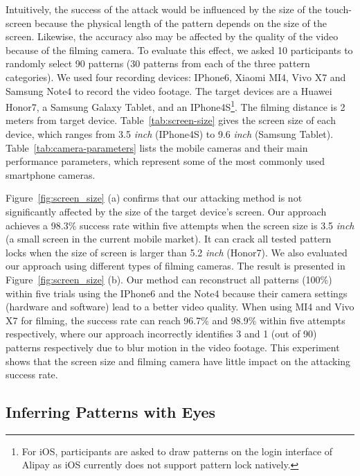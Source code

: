     Intuitively, the success of the attack would be influenced by the size of
    the touch-screen because the physical length of the pattern depends on
    the size of the screen. Likewise, the accuracy also may be affected by
    the quality of the video because of the filming camera. To evaluate this
    effect, we asked 10 participants to randomly select 90 patterns (30
    patterns from each of the three pattern categories). We used four
    recording devices: IPhone6, Xiaomi MI4, Vivo X7 and Samsung Note4 to
    record the video footage. The target devices are a Huawei Honor7, a
    Samsung Galaxy Tablet, and an IPhone4S\footnote{For iOS, participants are asked
    to draw  patterns on the login interface of Alipay as iOS
    currently does not support pattern lock natively.}. The filming distance is 2
    meters from target device. Table~\ref{tab:screen-size} gives the screen
    size of each device, which ranges from 3.5 \emph{inch} (IPhone4S) to
    9.6 \emph{inch} (Samsung Tablet). Table~\ref{tab:camera-parameters} lists
    the mobile cameras and their main performance parameters, which
    represent some of the most commonly used smartphone cameras.

    Figure~\ref{fig:screen_size} (a) confirms that our attacking method
    is not significantly affected by the size of the
     target device's screen. Our approach achieves a 98.3\%  success rate within five
    attempts when the screen size is 3.5 \emph{inch} (a small screen in the current
     mobile market). It can crack all tested pattern locks when
    the size of screen is larger than 5.2 \emph{inch} (Honor7). We also
    evaluated  our approach using different types of filming cameras.
    The result is presented in Figure~\ref{fig:screen_size}
    (b). Our method can reconstruct all patterns (100\%) within five trials using
    the IPhone6 and the Note4 because their camera settings (hardware and software) lead to a better video
    quality.   When using MI4 and Vivo X7 for filming,
     the success rate can reach 96.7\% and 98.9\% within five
    attempts respectively, where our approach incorrectly identifies 3 and 1 (out of
    90) patterns respectively due to blur motion in the video footage.
    This experiment shows that the screen size and filming camera
    have little impact on the attacking success rate.

    \subsection{Inferring Patterns with Eyes}


